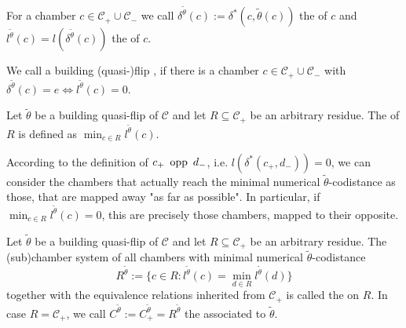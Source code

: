 \begin{defi}
	For a chamber $c \in \mathcal C_+ \cup \mathcal C_-$ we call $\delta^{\tilde \theta}(c) := \delta^*(c,\tilde \theta(c))$ the  of $c$ and $l^{\tilde \theta}(c) = l(\delta^{\tilde \theta}(c))$ the  of $c$.
\end{defi}

\begin{defi}
	We call a building (quasi-)flip , if there is a chamber $c \in \mathcal{C}_+ \cup \mathcal{C}_-$ with $\delta^{\tilde \theta}(c) = e \iff l^{\tilde \theta}(c) = 0$.
\end{defi}

\begin{defi}
	Let $\tilde \theta$ be a building quasi-flip of $\mathcal C$ and let $R \subseteq \mathcal C_+$ be an arbitrary residue. The  of $R$ is defined as $\min_{c \in R} l^{\tilde \theta}(c)$.
\end{defi}

According to the definition of $c_+ \opp d_-$, i.e. $l(\delta^*(c_+,d_-)) = 0$, we can consider the chambers that actually reach the minimal numerical $\tilde \theta$-codistance as those, that are mapped away "as far as possible". In particular, if $\min_{c \in R} l^{\tilde \theta}(c) = 0$, this are precisely those chambers, mapped to their opposite.

\begin{defi}
	Let $\tilde \theta$ be a building quasi-flip of $\mathcal C$ and let $R \subseteq \mathcal C_+$ be an arbitrary residue. The (sub)chamber system of all chambers with minimal numerical $\tilde \theta$-codistance
	$$ R^{\tilde \theta} := \{ c \in R : l^{\tilde \theta}(c) = \min_{d \in R} l^{\tilde \theta}(d) \} $$
	together with the equivalence relations inherited from $\mathcal C_+$ is called the  on $R$. In case $R = \mathcal C_+$, we call $C^{\tilde \theta} := C_+^{\tilde \theta} = R^{\tilde \theta}$ the  associated to $\tilde \theta$.
\end{defi}